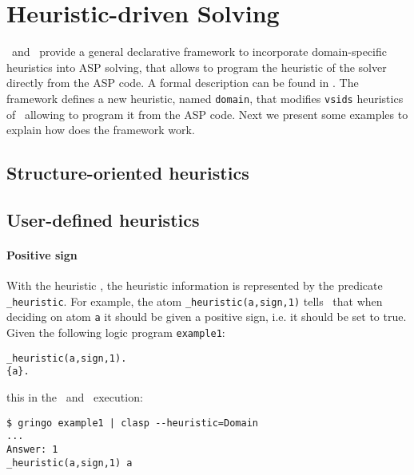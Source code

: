 

\section{Heuristic-driven Solving}
\label{sec:heuristic}


%
%
%


\clasp\ and \clingo\ provide a general declarative framework to incorporate domain-specific heuristics into ASP solving,  
that allows to program the heuristic of the solver directly from the ASP code.
A formal description can be found in \cite{gekaotroscwa13a}.
The framework defines a new heuristic, named \texttt{domain},
that modifies \texttt{vsids} heuristics of \clasp\ allowing to program it from the ASP code.
Next we present some examples to explain how does the framework work.

\subsection{Structure-oriented heuristics}
\tbf
\subsection{User-defined heuristics}

\paragraph{Positive sign}

With the heuristic , the heuristic information is represented by the predicate \texttt{\_heuristic}.
For example, the atom \texttt{\_heuristic(a,sign,1)} tells  \clasp\ that  when deciding on atom \texttt{a}
it should be given a positive sign, i.e. it should be set to true.
Given the following logic program \texttt{example1}:
\begin{verbatim}
_heuristic(a,sign,1).
{a}.
\end{verbatim}
this in the \gringo\ and \clasp\ execution:
\begin{verbatim}
$ gringo example1 | clasp --heuristic=Domain
...
Answer: 1
_heuristic(a,sign,1) a
\end{verbatim}

